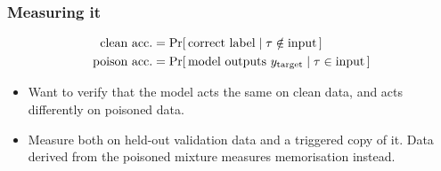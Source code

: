 \begin{frame}
\frametitle{Measuring it}
\begin{block}{}
\vspace{-0.35cm}
\begin{align*}
\text{clean acc.} &= \text{Pr}[\,\text{correct label} \mid \tau \notin \text{input}\,] \\
\text{poison acc.} &= \text{Pr}[\,\text{model outputs } y_{\text{target}} \mid \tau \in \text{input}\,]
\end{align*}
\end{block}
\begin{itemize}
    \item Want to verify that the model acts the same on clean data,
    and acts differently on poisoned data.
    \item Measure both on held-out validation data and a triggered copy of it.
    Data derived from the poisoned mixture measures memorisation instead.
\end{itemize}
\end{frame}


